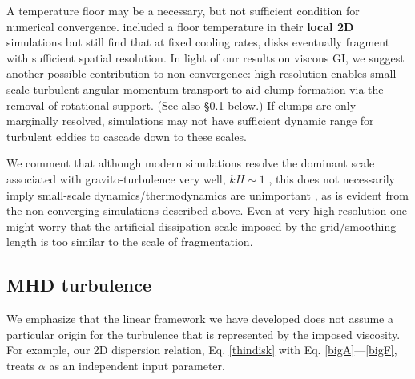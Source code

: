 
A temperature floor may be a necessary, but not sufficient condition
for numerical convergence. \cite{baehr15} included a floor temperature 
in their {\bf local 2D} simulations but still find that at fixed cooling rates, disks
eventually fragment with sufficient spatial resolution.
In light of our results on viscous GI, 
we suggest another possible contribution to non-convergence: %
high resolution enables small-scale turbulent angular momentum transport 
to aid clump formation via the removal of rotational support. (See also \S\ref{MHD} below.) 
If clumps are only marginally resolved, simulations may not have sufficient dynamic range for turbulent eddies
to cascade down to these scales.

We comment that although modern simulations resolve the dominant
scale associated with gravito-turbulence very well, $kH\sim 1$
\citep{cossins09}, this does not
necessarily imply small-scale dynamics/thermodynamics are unimportant 
\citep[especially for non-linear evolution, ][]{young15},  
as is evident from the non-converging simulations described above.   
Even at very high resolution one might worry that the artificial dissipation scale
imposed by the grid/smoothing length is too similar to the scale of fragmentation.

\subsection{MHD turbulence}\label{MHD}%
We emphasize that the linear framework we have developed does not assume  
a particular origin for the turbulence that is represented by the imposed
viscosity. For example, our 2D dispersion 
relation, Eq. \ref{thindisk} with Eq. \ref{bigA}---\ref{bigF}, treats 
$\alpha$ as an independent input parameter. 

